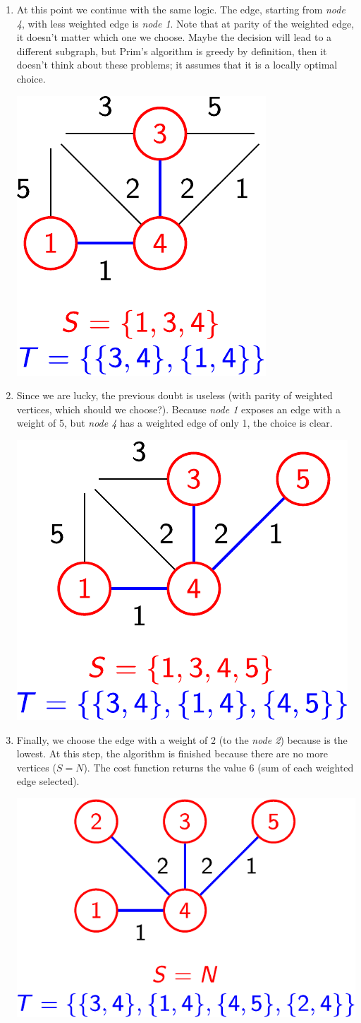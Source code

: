 \begin{examplebox}
\begin{enumerate}
        \item At this point we continue with the same logic. The edge, starting from \emph{node 4}, with less weighted edge is \emph{node 1}. Note that at parity of the weighted edge, it doesn't matter which one we choose. Maybe the decision will lead to a different subgraph, but Prim's algorithm is greedy by definition, then it doesn't think about these problems; it assumes that it is a locally optimal choice.
        \begin{center}
            \includegraphics[width=.25\textwidth]{img/prims-alg-4.pdf}
        \end{center}

        \item Since we are lucky, the previous doubt is useless (with parity of weighted vertices, which should we choose?). Because \emph{node 1} exposes an edge with a weight of 5, but \emph{node 4} has a weighted edge of only 1, the choice is clear.
        \begin{center}
            \includegraphics[width=.3\textwidth]{img/prims-alg-5.pdf}
        \end{center}

        \item Finally, we choose the edge with a weight of 2 (to the \emph{node 2}) because is the lowest. At this step, the algorithm is finished because there are no more vertices ($S = N$). The cost function returns the value $6$ (sum of each weighted edge selected).
        \begin{center}
            \includegraphics[width=.4\textwidth]{img/prims-alg-6.pdf}
        \end{center}
    \end{enumerate}
\end{examplebox}

